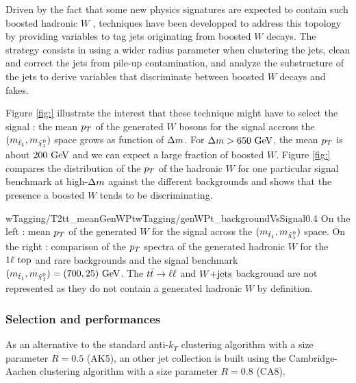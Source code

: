              Driven by the fact that some new physics signatures are expected to contain
             such boosted hadronic $W$ , techniques have been developped to
             address this topology by providing variables to tag jets originating from
             boosted $W$ decays. The strategy consists in using a wider radius parameter
             when clustering the jets, clean and correct the jets from pile-up contamination,
             and analyze the substructure of the jets to derive variables that discriminate
             between boosted $W$ decays and fakes.

             Figure \ref{fig:} illustrate the interest that these technique might have to
             select the signal : the mean $p_T$ of the generated
             $W$ bosons for the signal accross the $(m_{\tilde{t}_1}, m_{\tilde{\chi}_1^0})$
             space grows as function of $\Delta m$. For $\Delta m > 650~\text{GeV}$, the
             mean $p_T$ is about $200~\text{GeV}$ and we can expect a large fraction of boosted $W$.
             Figure \ref{fig:} compares the distribution of the $p_T$ of the hadronic $W$ for one
             particular signal benchmark at high-$\Delta m$ against the different backgrounds
             and shows that the presence a boosted $W$ tends to be discriminating.

                              {wTagging/T2tt_meanGenWPt}{wTagging/genWPt_backgroundVsSignal}{0.4}
                              {On the left : mean $p_T$ of the generated $W$ for the
                              signal across the $(m_{\tilde{t}_1}, m_{\tilde{\chi}_1^0})$ space.
                              On the right : comparison of the $p_T$ spectra of the generated
                              hadronic $W$ for the $1\ell~\text{top}$ and rare backgrounds and
                              the signal benchmark $(m_{\tilde{t}_1}, m_{\tilde{\chi}_1^0}) = (700,25) ~\text{GeV}$.
                              The $t\bar{t} \rightarrow \ell \ell$ and $\text{$W$+jets}$ background are not represented
                              as they do not contain a generated hadronic $W$ by definition.}

            \subsubsection{Selection and performances}

            As an alternative to the standard anti-$k_T$ clustering algorithm with a
            size parameter $R = 0.5$ (AK5), an other jet collection is built using the
            Cambridge-Aachen clustering algorithm with a size parameter $R = 0.8$ (CA8).

